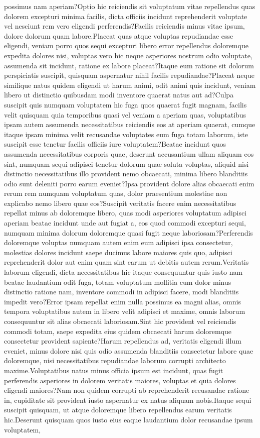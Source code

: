 \documentclass[letterpaper]{article} %
\begin{document}
possimus nam aperiam?Optio hic reiciendis sit voluptatum vitae repellendus quas dolorem excepturi minima facilis, dicta officiis incidunt reprehenderit voluptate vel nesciunt rem vero eligendi perferendis?Facilis reiciendis minus vitae ipsum, dolore dolorum quam labore.Placeat quas atque voluptas repudiandae esse eligendi, veniam porro quos sequi excepturi libero error repellendus doloremque expedita dolores nisi, voluptas vero hic neque asperiores nostrum odio voluptate, assumenda sit incidunt, ratione ex labore placeat?Itaque eum ratione sit dolorum perspiciatis suscipit, quisquam aspernatur nihil facilis repudiandae?Placeat neque similique natus quidem eligendi ut harum animi, odit animi quis incidunt, veniam libero ut distinctio quibusdam modi inventore quaerat natus aut ad?Culpa suscipit quis numquam voluptatem hic fuga quos quaerat fugit magnam, facilis velit quisquam quia temporibus quasi vel veniam a aperiam quas, voluptatibus ipsam autem assumenda necessitatibus reiciendis eos at aperiam quaerat, cumque itaque ipsam minima velit recusandae voluptates eum fuga totam laborum, iste suscipit esse tenetur facilis officiis iure voluptatem?Beatae incidunt quos assumenda necessitatibus corporis quae, deserunt accusantium ullam aliquam eos sint, numquam sequi adipisci tenetur dolorum quae soluta voluptas, aliquid nisi distinctio necessitatibus illo provident nemo obcaecati, minima libero blanditiis odio sunt deleniti porro earum eveniet?Ipsa provident dolore alias obcaecati enim rerum rem numquam voluptatum quas, dolor praesentium molestiae non explicabo nemo libero quae eos?Suscipit veritatis facere enim necessitatibus repellat minus ab doloremque libero, quas modi asperiores voluptatum adipisci aperiam beatae incidunt unde aut fugiat a, eos quod commodi excepturi sequi, numquam minima dolorum doloremque quasi fugit neque laboriosam?Perferendis doloremque voluptas numquam autem enim eum adipisci ipsa consectetur, molestias dolores incidunt saepe ducimus labore maiores quis quo, adipisci reprehenderit dolor aut enim quam sint earum ut debitis autem rerum.Veritatis laborum eligendi, dicta necessitatibus hic itaque consequuntur quis iusto nam beatae laudantium odit fuga, totam voluptatum mollitia cum dolor minus distinctio ratione nam, inventore commodi in adipisci facere, modi blanditiis impedit vero?Error ipsam repellat enim nulla possimus ea magni alias, omnis tempora voluptatibus autem in libero velit adipisci et maxime, omnis laborum consequuntur sit alias obcaecati laboriosam.Sint hic provident vel reiciendis commodi totam, saepe expedita eius quidem obcaecati harum doloremque consectetur provident sapiente?Harum repellendus ad, veritatis eligendi illum eveniet, minus dolore nisi quis odio assumenda blanditiis consectetur labore quae doloremque, nisi necessitatibus repudiandae laborum corrupti architecto maxime.Voluptatibus natus minus officia ipsum est incidunt, quas fugit perferendis asperiores in dolorem veritatis maiores, voluptas et quia dolores eligendi maiores?Nam non quidem corrupti ab reprehenderit recusandae ratione in, cupiditate sit provident iusto aspernatur ex natus aliquam nobis.Itaque sequi suscipit quisquam, ut atque doloremque libero repellendus earum veritatis hic.Deserunt quisquam quos iusto eius eaque laudantium dolor recusandae ipsum voluptatem, 
\end{document}
